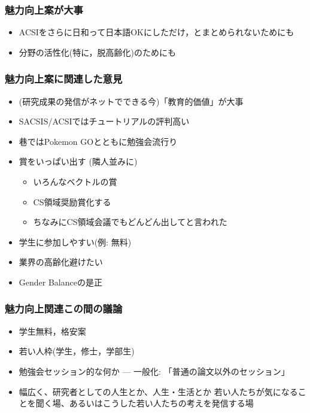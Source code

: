\documentclass[12pt,dvipdfmx]{beamer}
\begin{document}
\begin{frame}
\frametitle{魅力向上案が大事}

\begin{itemize}
\item ACSIをさらに日和って日本語OKにしただけ，とまとめられないためにも
\item 分野の活性化(特に，脱高齢化)のためにも
\end{itemize}

\end{frame}

\begin{frame}
\frametitle{魅力向上案に関連した意見}

\begin{itemize}
\item (研究成果の発信がネットでできる今)「教育的価値」が大事

\item SACSIS/ACSIではチュートリアルの評判高い

\item 巷ではPokemon GOとともに勉強会流行り

\item 賞をいっぱい出す (隣人並みに)
  \begin{itemize}
  \item いろんなベクトルの賞
  \item CS領域奨励賞化する
  \item ちなみにCS領域会議でもどんどん出してと言われた
  \end{itemize}

\item 学生に参加しやすい(例: 無料)

\item 業界の高齢化避けたい

\item Gender Balanceの是正
\end{itemize}
\end{frame}

\begin{frame}
\frametitle{魅力向上関連この間の議論}

\begin{itemize}
\item 学生無料，格安案
\item 若い人枠(学生，修士，学部生)
\item 勉強会セッション的な何か --- 一般化: 「普通の論文以外のセッション」
\item 幅広く、研究者としての人生とか、人生・生活とか
若い人たちが気になることを聞く場、あるいはこうした若い人たちの考えを発信する場
\end{itemize}
\end{frame}
\end{document}
